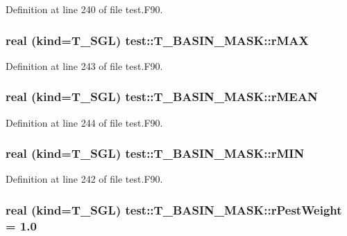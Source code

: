 Definition at line 240 of file test.F90.

\hypertarget{typetest_1_1_t___b_a_s_i_n___m_a_s_k_a526fcca78de92793975fe6c363854507}{
\subsubsection[{rMAX}]{\setlength{\rightskip}{0pt plus 5cm}real (kind={\bf T\_\-SGL}) {\bf test::T\_\-BASIN\_\-MASK::rMAX}}}
\label{typetest_1_1_t___b_a_s_i_n___m_a_s_k_a526fcca78de92793975fe6c363854507}


Definition at line 243 of file test.F90.

\hypertarget{typetest_1_1_t___b_a_s_i_n___m_a_s_k_a52a3447734db74c1a98ac0af73f1383f}{
\subsubsection[{rMEAN}]{\setlength{\rightskip}{0pt plus 5cm}real (kind={\bf T\_\-SGL}) {\bf test::T\_\-BASIN\_\-MASK::rMEAN}}}
\label{typetest_1_1_t___b_a_s_i_n___m_a_s_k_a52a3447734db74c1a98ac0af73f1383f}


Definition at line 244 of file test.F90.

\hypertarget{typetest_1_1_t___b_a_s_i_n___m_a_s_k_a62e7fb67c49d4898b95a2bfd495cae86}{
\subsubsection[{rMIN}]{\setlength{\rightskip}{0pt plus 5cm}real (kind={\bf T\_\-SGL}) {\bf test::T\_\-BASIN\_\-MASK::rMIN}}}
\label{typetest_1_1_t___b_a_s_i_n___m_a_s_k_a62e7fb67c49d4898b95a2bfd495cae86}


Definition at line 242 of file test.F90.

\hypertarget{typetest_1_1_t___b_a_s_i_n___m_a_s_k_a5398f17e54adaecac9bebfccd65d71fb}{
\subsubsection[{rPestWeight}]{\setlength{\rightskip}{0pt plus 5cm}real (kind={\bf T\_\-SGL}) {\bf test::T\_\-BASIN\_\-MASK::rPestWeight} = 1.0}}
\label{typetest_1_1_t___b_a_s_i_n___m_a_s_k_a5398f17e54adaecac9bebfccd65d71fb}


